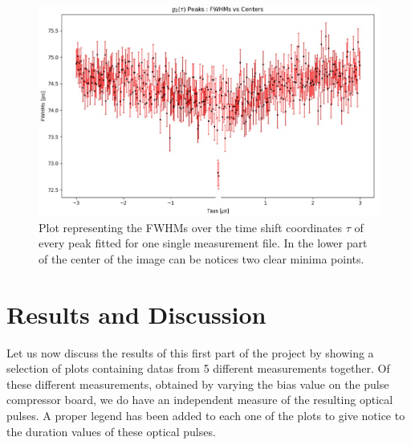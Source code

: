 \begin{figure}[hbtp]
\centering
\includegraphics[width=1\textwidth]{FWHMvsTAU_Single.jpg}
\caption{Plot representing the FWHMs over the time shift coordinates $\tau$ of every peak fitted for one single measurement file. In the lower part of the center of the image can be notices two clear minima points.}
\label{FWHMvsTauSingle}
\end{figure}


\section{Results and Discussion}
\label{EOMresults}
Let us now discuss the results of this first part of the project by showing a selection of plots containing datas from 5 different measurements together.
Of these different measurements, obtained by varying the bias value on the pulse compressor board, we do have an independent measure of the resulting optical pulses. A proper legend has been added to each one of the plots to give notice to the duration values of these optical pulses.

